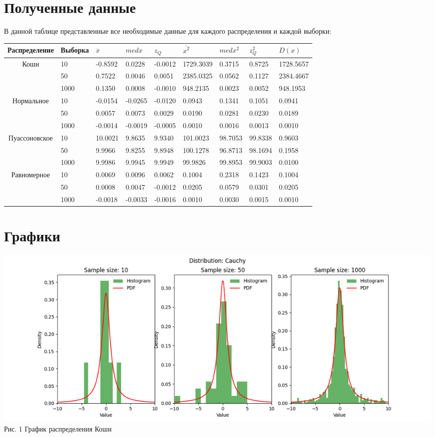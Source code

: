 \documentclass[12pt]{article}
\begin{document}
\section{Полученные данные}
В данной таблице представленные все необходимые данные для каждого распределения и каждой выборки:\\
\begin{tabular}{|c|l|l|l|l|l|l|l|l|}
	\hline
	Распределение & Выборка & $\overline{x}$ & $med x$  & $z_Q$ & $\overline{x^2}$ & $med x^2$ & $z_Q^2$ & $D(x)$ \\
	\hline
	Коши & 10 & -0.8592 & 0.0228 & -0.0012 & 1729.3039 & 0.3715 & 0.8725 & 1728.5657 \\
	\hline
	   \ & 50 & 0.7522 & 0.0046 & 0.0051 & 2385.0325 & 0.0562 & 0.1127 & 2384.4667 \\
	\hline
	   \ & 1000 & 0.1350 & 0.0008 & -0.0010 & 948.2135 & 0.0023 & 0.0052 & 948.1953 \\
	\hline
		Нормальное & 10 & -0.0154 & -0.0265 & -0.0120 & 0.0943 & 0.1341 & 0.1051 & 0.0941 \\
	\hline
		\ & 50 & 0.0057 & 0.0073 & 0.0029 & 0.0190 & 0.0281 & 0.0230 & 0.0189 \\
	\hline
		\ & 1000 & -0.0014 & -0.0019 & -0.0005 & 0.0010 & 0.0016 & 0.0013 & 0.0010 \\
	\hline
		Пуассоновское & 10 & 10.0021 & 9.8635 & 9.9340 & 101.0023 & 98.7053 & 99.8338 & 0.9603 \\
	\hline
		\ & 50 & 9.9966 & 9.8255 & 9.8948 & 100.1278 & 96.8713 & 98.1694 & 0.1958 \\
	\hline
		\ & 1000 & 9.9986 & 9.9945 & 9.9949 & 99.9826 & 99.8953 & 99.9003 & 0.0100 \\
	\hline
		Равномерное & 10 & 0.0069 & 0.0096 & 0.0062 & 0.1004 & 0.2318 & 0.1423 & 0.1004 \\
	\hline
		\ & 50 & 0.0008 & 0.0047 & -0.0012 & 0.0205 & 0.0579 & 0.0301 & 0.0205 \\
	\hline
		\ & 1000 & -0.0018 & -0.0033 & -0.0016 & 0.0010 & 0.0030 & 0.0015 & 0.0010 \\
	\hline

\end{tabular}

\section{Графики}

\begin{center}
    \includegraphics[scale=0.65]{lab_1_Cauchy.png} \\
    Рис. 1 График распределения Коши
\end{center}
\end{document}
